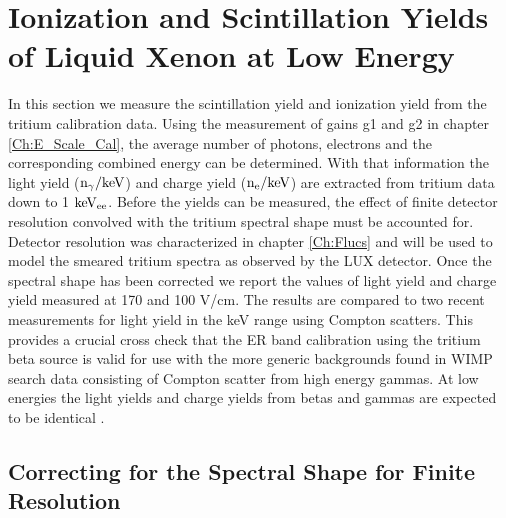 \renewcommand{\thechapter}{6}

\chapter{Ionization and Scintillation Yields of Liquid Xenon at Low Energy}
\label{Ch:LYQY}

In this section we measure the scintillation yield and ionization yield from the tritium calibration data. Using the measurement of gains g1 and g2 in chapter \ref{Ch:E_Scale_Cal}, the average number of photons, electrons and the corresponding combined energy can be determined. With that information the light yield ($\rm n_\gamma/keV$) and charge yield ($\rm n_e/keV$) are extracted from tritium data down to 1 $\rm keV_{ee}$. Before the yields can be measured, the effect of finite detector resolution convolved with the tritium spectral shape must be accounted for. Detector resolution was characterized in chapter \ref{Ch:Flucs} and will be used to model the smeared tritium spectra as observed by the LUX detector. Once the spectral shape has been corrected we report the values of light yield and charge yield measured at 170 and 100 V/cm. The results are compared to two recent measurements for light yield in the keV range using Compton scatters. This provides a crucial cross check that the ER band calibration using the tritium beta source is valid for use with the more generic backgrounds found in WIMP search data consisting of Compton scatter from high energy gammas. At low energies the light yields and charge yields from betas and gammas are expected to be identical \cite{NEST} \cite{NEST_2013}.


\section{Correcting for the Spectral Shape for Finite Resolution}
\label{sec:Smear}

